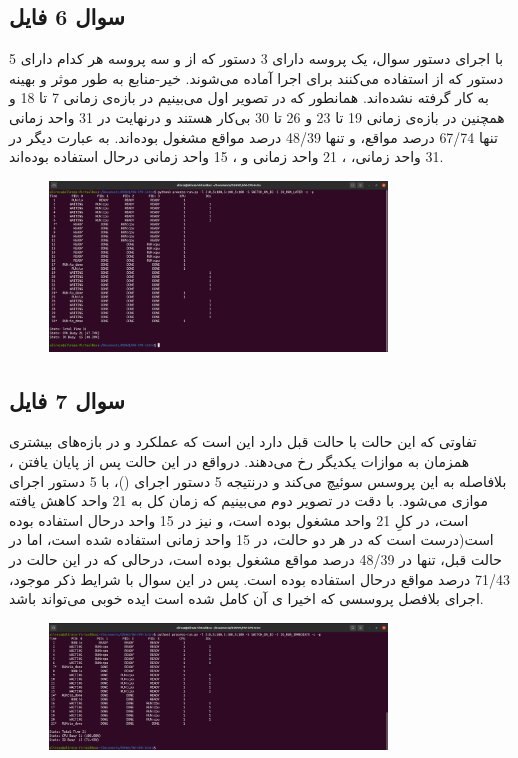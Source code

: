\documentclass{article}
\begin{document}
\subsection{سوال 6 فایل}
با اجرای دستور سوال، یک پروسه دارای 3 دستور که از  و سه پروسه هر کدام دارای 5 دستور که از  استفاده می‌کنند برای اجرا آماده می‌شوند.
\newline
خیر-منابع به طور موثر و بهینه به کار گرفته نشده‌اند. همانطور که در تصویر اول می‌بینیم  در بازه‌ی زمانی 7 تا 18 و همچنین  در بازه‌ی زمانی 19 تا 23 و 26 تا 30 بی‌کار هستند و درنهایت در 31 واحد زمانی  تنها 67/74 درصد مواقع، و  تنها 48/39 درصد مواقع مشغول بوده‌اند. به عبارت دیگر در 31 واحد زمانی، ، 21 واحد زمانی و ، 15 واحد زمانی درحال استفاده بوده‌اند.
\begin{figure}[H]
    \centering
    \includegraphics[width=0.8\textwidth]{figures/7.1.png}
    \caption{}
    \label{fig:fig1}
\end{figure}
\subsection{سوال 7 فایل}
تفاوتی که این حالت با حالت قبل دارد این است که عملکرد  و  در بازه‌های بیشتری همزمان به موازات یکدیگر رخ می‌دهند. درواقع در این حالت پس از پایان یافتن ، بلافاصله به این پروسس سوئیچ می‌کند و درنتیجه 5 دستور اجرای ()، با 5 دستور اجرای  موازی می‌شود. با دقت در تصویر دوم می‌بینیم که زمان کل به 21 واحد کاهش یافته است،  در کلِ 21 واحد مشغول بوده است، و  نیز در 15 واحد درحال استفاده بوده است(درست است که در هر دو حالت،  در 15 واحد زمانی استفاده شده است، اما در حالت قبل،  تنها در 48/39 درصد مواقع مشغول بوده است، درحالی که در این حالت در 71/43 درصد مواقع درحال استفاده بوده است. پس در این سوال با شرایط ذکر موجود، اجرای بلافصل پروسسی که اخیرا ی آن کامل شده است ایده خوبی می‌تواند باشد.
\begin{figure}[H]
    \centering
    \includegraphics[width=0.8\textwidth]{figures/7.2.png}
    \caption{}
    \label{fig:fig1}
\end{figure}
\end{document}
